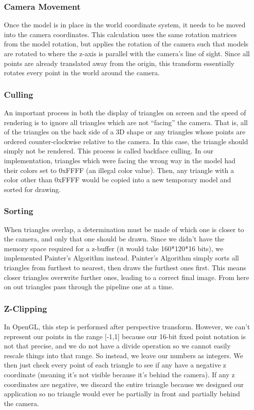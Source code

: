 \documentclass[onecolumn]{IEEEtran}
\begin{document}
\subsubsection{Camera Movement}
Once the model is in place in the world coordinate system, it needs to be moved into the camera coordinates.  This calculation uses the same rotation matrices from the model rotation, but applies the rotation of the camera such that models are rotated to where the z-axis is parallel with the camera’s line of sight.  Since all points are already translated away from the origin, this transform essentially rotates every point in the world around the camera.

\subsubsection{Culling}
An important process in both the display of triangles on screen and the speed of rendering is to ignore all triangles which are not “facing” the camera.  That is, all of the triangles on the back side of a 3D shape or any triangles whose points are ordered counter-clockwise relative to the camera.  In this case, the triangle should simply not be rendered.  This process is called backface culling.  In our implementation, triangles which were facing the wrong way in the model had their colors set to 0xFFFF (an illegal color value).  Then, any triangle with a color other than 0xFFFF would be copied into a new temporary model and sorted for drawing.

\subsubsection{Sorting}
When triangles overlap, a determination must be made of which one is closer to the camera, and only that one should be drawn.  Since we didn’t have the memory space required for a z-buffer (it would take 160*120*16 bits), we implemented Painter’s Algorithm instead.  Painter’s Algorithm simply sorts all triangles from furthest to nearest, then draws the furthest ones first.  This means closer triangles overwrite further ones, leading to a correct final image.  From here on out triangles pass through the pipeline one at a time.

\subsubsection{Z-Clipping}
In OpenGL, this step is performed after perspective transform.   However, we can’t represent our points in the range [-1,1] because our 16-bit fixed point notation is not that precise, and we do not have a divide operation so we cannot easily rescale things into that range.  So instead, we leave our numbers as integers.  We then just check every point of each triangle to see if any have a negative z coordinate (meaning it’s not visible because it’s behind the camera).  If any z coordinates are negative, we discard the entire triangle because we designed our application so no triangle would ever be partially in front and partially behind the camera.
\end{document}
